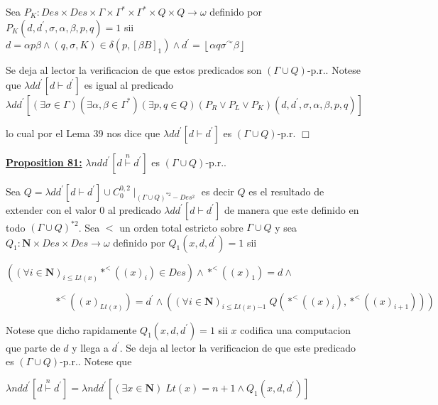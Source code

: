  Sea $P_{K}:Des\times Des\times \Gamma \times \Gamma ^{\ast }\times \Gamma ^{\ast }\times Q\times Q\rightarrow \omega $ definido por $P_{K}(d,d^{\prime },\sigma ,\alpha ,\beta ,p,q)=1$ sii
  $\displaystyle d=\alpha p\beta \wedge (q,\sigma ,K)\in \delta \left( p,\left[ \beta B\right] _{1}\right) \wedge d^{\prime }=\left\lfloor \alpha q\sigma ^{\curvearrowright }\beta \right\rfloor $

  Se deja al lector la verificacion de que estos predicados son $(\Gamma \cup Q)$-p.r.. Notese que $\lambda dd^{\prime }\left[ d\vdash d^{\prime }\right] $ es igual al predicado
  $\displaystyle \lambda dd^{\prime }\left[ (\exists \sigma \in \Gamma )(\exists \alpha ,\beta \in \Gamma ^{\ast })(\exists p,q\in Q)(P_{R}\vee P_{L}\vee P_{K})(d,d^{\prime },\sigma ,\alpha ,\beta ,p,q)\right] $

  lo cual por el Lema 39 nos dice que $\lambda dd^{\prime } \left[ d\vdash d^{\prime }\right] $ es $(\Gamma \cup Q)$-p.r. $\Box$


  \textbf{\underline{Proposition 81:}} $\lambda ndd^{\prime }\left[ d\overset{n}{\vdash }d^{\prime }\right] $ es $ (\Gamma \cup Q)$-p.r..

  \PROOF Sea $Q=\lambda dd^{\prime }\left[ d\vdash d^{\prime }\right] \cup C_{0}^{0,2}\mid _{(\Gamma \cup Q)^{\ast 2}-Des^{2}}$ es decir $Q$ es el resultado de extender con el valor $0$ al predicado $\lambda dd^{\prime } \left[ d\vdash d^{\prime }\right] $ de manera que este definido en todo $ (\Gamma \cup Q)^{\ast 2}$. Sea $< $ un orden total estricto sobre $\Gamma \cup Q$ y sea $Q_{1}:\mathbf{N}\times Des\times Des\rightarrow \omega $ definido por $Q_{1}(x,d,d^{\prime })=1$ sii

  $\left( (\forall i\in \mathbf{N})_{i\leq Lt(x)}\ast ^{< }((x)_{i})\in Des\right) \wedge \ast ^{< }((x)_{1})=d\wedge $

  $\ \ \ \ \ \ \ \ \ \ \ \ \ \ \ \ \ \ \ \ \ \ \ast ^{< }((x)_{Lt(x)})=d^{\prime }\wedge \left( (\forall i\in \mathbf{N})_{i\leq Lt(x)\dot{-}1}\;Q(\ast ^{< }((x)_{i}),\ast ^{< }((x)_{i+1}))\right) $

  Notese que dicho rapidamente $Q_{1}(x,d,d^{\prime })=1$ sii $x$ codifica una computacion que parte de $d$ y llega a $d^{\prime }$. Se deja al lector la verificacion de que este predicado es $(\Gamma \cup Q)$-p.r.. Notese que

  $\displaystyle \lambda ndd^{\prime }\left[ d\overset{n}{\vdash }d^{\prime }\right] =\lambda ndd^{\prime }\left[ \left( \exists x\in \mathbf{N}\right) \;Lt(x)=n+1\wedge Q_{1}(x,d,d^{\prime })\right] $

